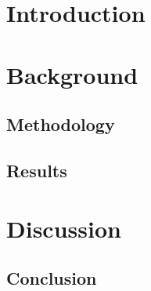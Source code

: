 \documentclass[a4paper,11pt]{report}
\begin{document}
\def\spath#1{}
\spath{Title} %

\tableofcontents
\newpage



\chapter{Introduction}
\spath{Intro}





\newpage
\chapter{Background}


\newpage
\section{Methodology}


\newpage
\section{Results}


\newpage
\chapter{Discussion}

\newpage
\section{Conclusion}


\newpage
\printbibliography[title={Bliblyogrpah}]
\end{document}
